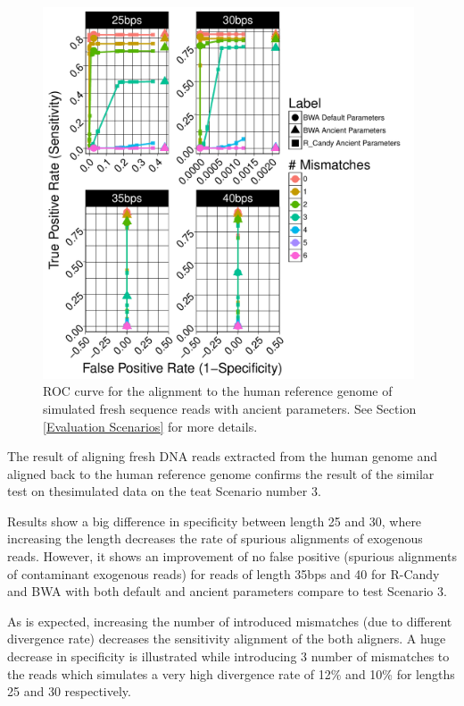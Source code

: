 \documentclass[11pt,a4paper]{report}
\begin{document}
\begin{figure}[H]
\centering
\includegraphics[width=11cm]{pictures/f_DS9_emp.pdf}
\caption{ 
ROC curve for the alignment to the human reference genome of simulated 
fresh sequence reads with ancient parameters. See Section \ref{Evaluation 
Scenarios} for more details.
}
\label{DS9_emp}
\end{figure}
 

The result of aligning fresh DNA reads extracted from the human genome
and aligned back to the human reference genome confirms the result of 
the similar test on thesimulated data on the teat Scenario number 3.  

 
Results show a big difference in specificity between length 25 and 30, where 
increasing the length decreases the rate of spurious alignments of
exogenous reads.
However, it shows an improvement of no false positive
(spurious alignments of contaminant exogenous reads)
 for reads of length
35bps and 40 for R-Candy and BWA with both default and 
ancient parameters compare to test Scenario 3.

As is expected, increasing the number of introduced mismatches
(due to different divergence rate) decreases the sensitivity alignment 
of the both aligners. A huge decrease in specificity is illustrated while 
introducing 3 number of mismatches to the reads which simulates a very 
high divergence rate of 12\% and 10\% for lengths 25 and 30 respectively.


\end{document}

